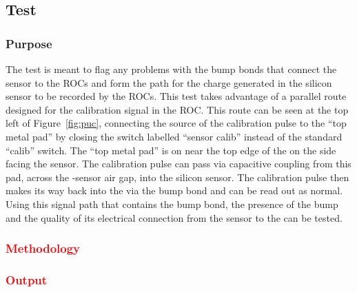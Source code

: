 
\subsection{\bb Test}
\label{ss:bb}

\subsubsection{Purpose}

The \bb test is meant to flag any problems with the bump bonds that connect the sensor to the ROCs
and form the path for the charge generated in the silicon sensor to be recorded by the ROCs.
This test takes advantage of a parallel route designed for the calibration signal in the ROC.
This route can be seen at the top left of Figure~\ref{fig:puc}, 
connecting the source of the \vcal calibration pulse to the ``top metal pad'' by closing the switch labelled ``sensor calib'' instead of the standard ``calib'' switch.
The ``top metal pad'' is on near the top edge of the \roc on the side facing the sensor.
The calibration pulse can pass via capacitive coupling from this pad, 
across the \roc-sensor air gap, into the silicon sensor.
The calibration pulse then makes its way back into the \roc via the bump bond and can be read out as normal.
Using this signal path that contains the bump bond, 
the presence of the bump and the quality of its electrical connection from the sensor to the \roc can be tested.

\subsubsection{\textcolor{red}{Methodology}}
\subsubsection{\textcolor{red}{Output}}

